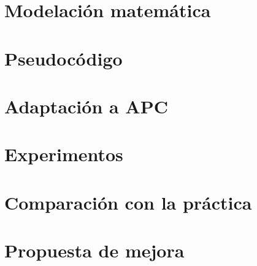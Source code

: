 \documentclass[12pt, spanish]{article}
\begin{document}
\section{Modelación matemática}

\section{Pseudocódigo}

\section{Adaptación a APC}

\section{Experimentos}

\section{Comparación con la práctica}

\section{Propuesta de mejora}
\end{document}
